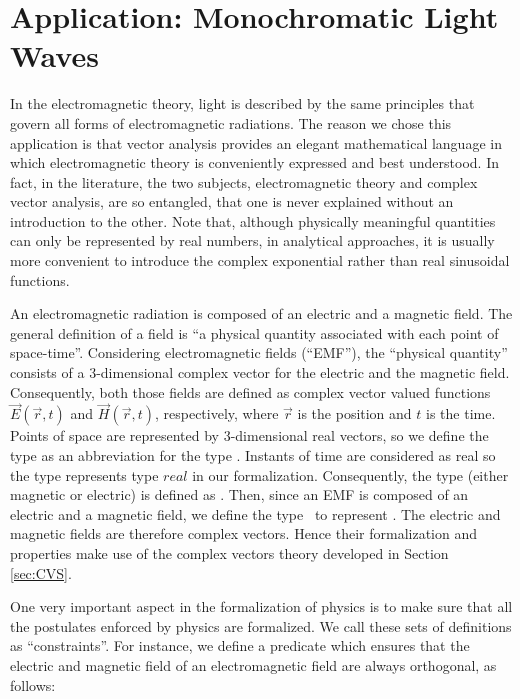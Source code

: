 \documentclass{llncs}
\begin{document}
{  \section{Application: Monochromatic Light Waves}
  \label{sec:application}
In the electromagnetic theory, light is described by the same principles that govern all forms of electromagnetic radiations.
The reason we chose this application is that vector analysis provides an elegant mathematical language in which electromagnetic theory is conveniently expressed and best understood. 
In fact, in the literature, the two subjects, electromagnetic theory and complex vector analysis, are so entangled, that one is never explained without an introduction to the other. Note that, although physically meaningful quantities can only be represented by real numbers, in analytical approaches, it is usually more convenient to introduce the complex exponential rather than real sinusoidal functions. 

An electromagnetic radiation is composed of an electric and a magnetic field. 
The general definition of a field is ``a physical quantity associated with each point of space-time''.
Considering electromagnetic fields (``EMF''), the ``physical quantity'' consists of a 3-dimensional complex vector for the electric and the magnetic field.
Consequently, both those fields are defined as complex vector valued functions $\vec{E}(\vec{r},t)$ and $\vec{H}(\vec{r},t)$, respectively, where $\vec r$ is the position and $t$ is the time.
Points of space are represented by 3-dimensional real vectors, so we define the type  as an abbreviation for the type . Instants of time are considered as real so the type  represents type ${real}$ in our formalization.
Consequently, the type  (either magnetic or electric) is defined as .
	Then, since an EMF is composed of an electric and a magnetic field, we define the type \hol \emf\ to represent .
	The electric and magnetic fields are therefore complex vectors.
	Hence their formalization and properties make use of the complex vectors theory developed in Section \ref{sec:CVS}.

One very important aspect in the formalization of physics is to make sure that all the postulates enforced by physics are formalized. We call these sets of definitions as ``constraints''. For instance, we define a predicate which ensures that the electric and magnetic field of an electromagnetic field are always orthogonal, as follows: 

}
\end{document}

